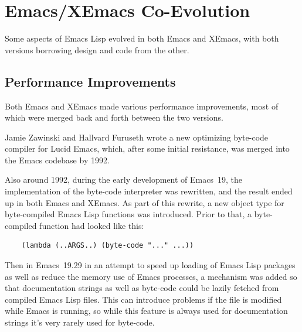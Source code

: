 \documentclass[format=acmsmall,screen]{acmart}
\newcommand \Elisp {Emacs Lisp}
\begin{document}
\section{Emacs/XEmacs Co-Evolution}
\label{sec:coevolution}

Some aspects of \Elisp{} evolved in both Emacs and XEmacs, with both
versions borrowing design and code from the other.

\subsection{Performance Improvements}

Both Emacs and XEmacs made various performance improvements, most of
which were merged back and forth between the two versions.

Jamie Zawinski and Hallvard Furuseth wrote a new optimizing
byte-code compiler for Lucid Emacs, which, after some initial resistance, was
merged into the Emacs codebase by 1992.

Also around 1992, during the early development of Emacs~19, the
implementation of the byte-code interpreter was rewritten, and the
result ended up in both Emacs and XEmacs.
As part of this rewrite, a new object type for byte-compiled \Elisp{}
functions was introduced.  Prior to that, a byte-compiled function had
looked like this:
\begin{verbatim}
    (lambda (..ARGS..) (byte-code "..." ...))
\end{verbatim}
Then in Emacs~19.29 in an attempt to speed up loading of \Elisp{} packages
as well as reduce the memory use of Emacs processes, a mechanism was added
so that documentation strings as well as byte-code could be lazily fetched
from compiled \Elisp{} files.  This can introduce problems if the file is
modified while Emacs is running, so while this feature is always used
for documentation strings it's very rarely used for byte-code.

\end{document}
